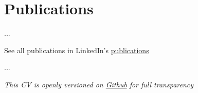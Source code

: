 \documentclass[a4paper,12pt]{article}
\begin{document}
\section{Publications}

\begin{refsection}
\nocite{*}
\printbibliography[heading=none]
\end{refsection}

...

See all publications in LinkedIn's \href{https://www.linkedin.com/in/dmitry-khorkin/details/publications/}{publications}

...

\textit{This CV is openly versioned on \href{https://github.com/DimaAmega/CV}{Github} for full transparency}
\end{document}
